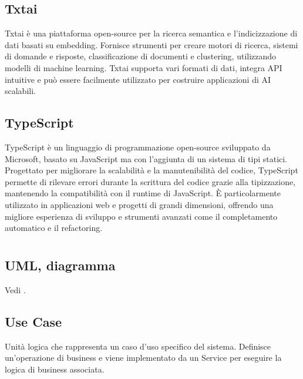 \subsection*{Txtai}
Txtai è una piattaforma open-source per la ricerca semantica e l'indicizzazione di dati basati su embedding. Fornisce strumenti per creare motori di 
ricerca, sistemi di domande e risposte, classificazione di documenti e clustering, utilizzando modelli di machine learning. Txtai supporta vari formati 
di dati, integra API intuitive e può essere facilmente utilizzato per costruire applicazioni di AI scalabili.

\hypertarget{sec:typescript}{}
\subsection*{TypeScript}
TypeScript è un linguaggio di programmazione open-source sviluppato da Microsoft, basato su JavaScript ma con l'aggiunta di un sistema di tipi statici. 
Progettato per migliorare la scalabilità e la manutenibilità del codice, TypeScript permette di rilevare errori durante la scrittura del codice grazie 
alla tipizzazione, mantenendo la compatibilità con il runtime di JavaScript. È particolarmente utilizzato in applicazioni web e progetti di grandi 
dimensioni, offrendo una migliore esperienza di sviluppo e strumenti avanzati come il completamento automatico e il refactoring.

\newpage



\section{}

\hypertarget{sec:uml}{}
\subsection*{UML, diagramma}
Vedi .

\hypertarget{sec:use case}{}
\subsection*{Use Case}
Unità logica che rappresenta un caso d’uso specifico del sistema. Definisce un’operazione di business e viene implementato da un Service per eseguire la logica di business associata.

\newpage


